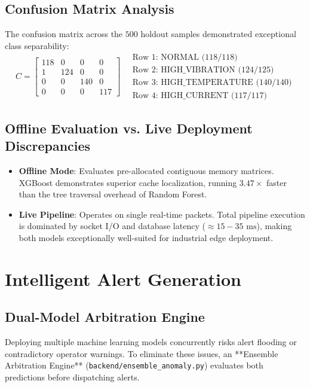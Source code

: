 \documentclass[12pt,a4paper]{report}
\begin{document}
\section{Confusion Matrix Analysis}
The confusion matrix across the $500$ holdout samples demonstrated exceptional class separability:
\begin{equation}
    C = \begin{bmatrix}
        118 & 0 & 0 & 0 \\
        1 & 124 & 0 & 0 \\
        0 & 0 & 140 & 0 \\
        0 & 0 & 0 & 117
    \end{bmatrix}
    \quad
    \begin{array}{l}
        \text{Row 1: NORMAL (118/118)} \\
        \text{Row 2: HIGH\_VIBRATION (124/125)} \\
        \text{Row 3: HIGH\_TEMPERATURE (140/140)} \\
        \text{Row 4: HIGH\_CURRENT (117/117)}
    \end{array}
\end{equation}

\section{Offline Evaluation vs. Live Deployment Discrepancies}
\begin{itemize}
    \item \textbf{Offline Mode}: Evaluates pre-allocated contiguous memory matrices. XGBoost demonstrates superior cache localization, running $3.47\times$ faster than the tree traversal overhead of Random Forest.
    \item \textbf{Live Pipeline}: Operates on single real-time packets. Total pipeline execution is dominated by socket I/O and database latency ($\approx 15 - 35\text{ ms}$), making both models exceptionally well-suited for industrial edge deployment.
\end{itemize}

\chapter{Intelligent Alert Generation}

\section{Dual-Model Arbitration Engine}
Deploying multiple machine learning models concurrently risks alert flooding or contradictory operator warnings. To eliminate these issues, an **Ensemble Arbitration Engine** (\texttt{backend/ensemble\_anomaly.py}) evaluates both predictions before dispatching alerts.
\end{document}
